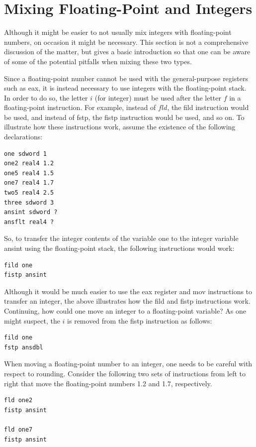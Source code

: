 \documentclass[10pt]{book}
\begin{document}
\section{Mixing Floating-Point and Integers}
Although it might be easier to not usually mix integers with floating-point numbers, on occasion it might be necessary. This section is not a comprehensive discussion of the matter, but gives a basic introduction so that one can be aware of some of the potential pitfalls when mixing these two types.

Since a floating-point number cannot be used with the general-purpose registers such as eax, it is instead necessary to use integers with the floating-point stack. In order to do so, the letter $i$ (for integer) must be used after the letter $f$ in a floating-point instruction. For example, instead of $f l d$, the fild instruction would be used, and instead of fstp, the fistp instruction would be used, and so on. To illustrate how these instructions work, assume the existence of the following declarations:

\begin{verbatim}
one sdword 1
one2 real4 1.2
one5 real4 1.5
one7 real4 1.7
two5 real4 2.5
three sdword 3
ansint sdword ?
ansflt real4 ?
\end{verbatim}

So, to transfer the integer contents of the variable one to the integer variable ansint using the floating-point stack, the following instructions would work:

\begin{verbatim}
fild one
fistp ansint
\end{verbatim}

Although it would be much easier to use the eax register and mov instructions to transfer an integer, the above illustrates how the fild and fistp instructions work. Continuing, how could one move an integer to a floating-point variable? As one might suspect, the $i$ is removed from the fistp instruction as follows:

\begin{verbatim}
fild one
fstp ansdbl
\end{verbatim}

When moving a floating-point number to an integer, one needs to be careful with respect to rounding. Consider the following two sets of instructions from left to right that move the floating-point numbers 1.2 and 1.7, respectively.
\begin{verbatim}
fld one2
fistp ansint

fld one7
fistp ansint
\end{verbatim}
\end{document}
